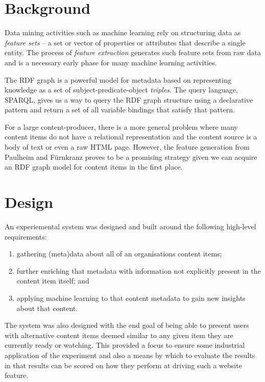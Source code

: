 \documentclass{sig-alternate-05-2015}
\begin{document}
\section{Background}

Data mining activities such as machine learning rely on structuring data as
\emph{feature sets}\cite{bishop2006pattern} -- a set or vector of properties or
attributes that describe a single entity.
The process of \emph{feature extraction}
generates such feature sets from raw data and is a necessary early phase for
many machine learning activities.

The RDF graph is a powerful model
for metadata based on representing knowledge as a set of
subject-predicate-object \emph{triples}. The query language, SPARQL, gives us a
way to query the RDF graph structure using a declarative pattern and return a
set of all variable bindings that satisfy that pattern.

For a large content-producer, there is a more general problem where many content
items do not have a relational representation and the content source is a body
of text or even a raw HTML page. However, the feature generation from Paulheim
and F\"urnkranz proves to be a promising strategy given we can acquire an RDF
graph model for content items in the first place.

\section{Design}

An experiemental system was designed and built around the following
high-level requirements:

\begin{enumerate}
\item gathering (meta)data about all of an organisations content items;
\item further enriching that metadata with information not explicitly present
in the content item itself; and
\item applying machine learning to that content metadata to gain new insights
about that content.
\end{enumerate}

The system was also designed with the end goal of being able to present
users with alternative content items deemed similar to any given item they
are currently ready or watching. This provided a focus to ensure some
industrial application of the experiment and also a means by which to evaluate
the results in that results can be scored on how they perform at driving
such a website feature.
\end{document}
